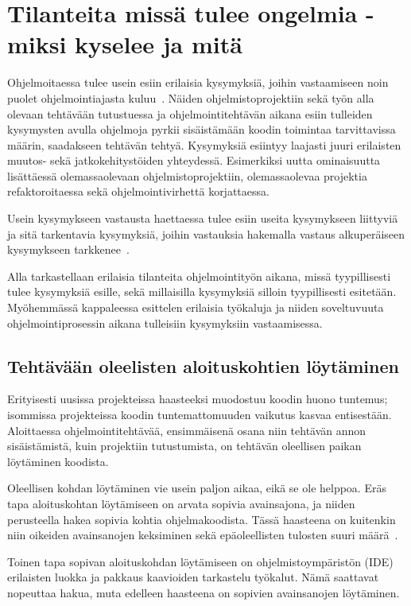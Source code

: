 \documentclass[finnish]{../tktltiki2}
\theoremstyle{definition}
\theoremstyle{remark}
\begin{document}
\section{Tilanteita missä tulee ongelmia - miksi kyselee ja mitä}
Ohjelmoitaessa tulee usein esiin erilaisia kysymyksiä, joihin vastaamiseen noin puolet ohjelmointiajasta kuluu~\cite{eliciting-design-requirements-for-maintenance-oriented-ides}. Näiden ohjelmistoprojektiin sekä työn alla olevaan tehtävään tutustuessa ja ohjelmointitehtävän aikana esiin tulleiden kysymysten avulla ohjelmoja pyrkii sisäistämään koodin toimintaa tarvittavissa määrin, saadakseen tehtävän tehtyä. Kysymyksiä esiintyy laajasti juuri erilaisten muutos- sekä jatkokehitystöiden yhteydessä. Esimerkiksi uutta ominaisuutta lisättäessä olemassaolevaan ohjelmistoprojektiin, olemassaolevaa projektia refaktoroitaessa sekä ohjelmointivirhettä korjattaessa.

Usein kysymykseen vastausta haettaessa tulee esiin useita kysymykseen liittyviä ja sitä tarkentavia kysymyksiä, joihin vastauksia hakemalla vastaus alkuperäiseen kysymykseen tarkkenee~\cite{questions-during-software-evolution-tasks}.

Alla tarkastellaan erilaisia tilanteita ohjelmointityön aikana, missä tyypillisesti tulee kysymyksiä esille, sekä millaisilla kysymyksiä silloin tyypillisesti esitetään. Myöhemmässä kappaleessa esittelen erilaisia työkaluja ja niiden soveltuvuuta ohjelmointiprosessin aikana tulleisiin kysymyksiin vastaamisessa.

\subsection{Tehtävään oleelisten aloituskohtien löytäminen}
Erityisesti uusissa projekteissa haasteeksi muodostuu koodin huono tuntemus; isommissa projekteissa koodin tuntemattomuuden vaikutus kasvaa entisestään.
Aloittaessa ohjelmointitehtävää, ensimmäisenä osana niin tehtävän annon sisäistämistä, kuin projektiin tutustumista, on tehtävän oleellisen paikan löytäminen koodista.

Oleellisen kohdan löytäminen vie usein paljon aikaa, eikä se ole helppoa. Eräs tapa aloituskohtan löytämiseen on arvata sopivia avainsajona, ja niiden perusteella hakea sopivia kohtia ohjelmakoodista. Tässä haasteena on kuitenkin niin oikeiden avainsanojen keksiminen sekä epäoleellisten tulosten suuri määrä~\cite{what-to-search-for}.

Toinen tapa sopivan aloituskohdan löytämiseen on ohjelmistoympäristön (IDE) erilaisten luokka ja pakkaus kaavioiden tarkastelu työkalut. Nämä saattavat nopeuttaa hakua, muta edelleen haasteena on sopivien avainsanojen löytäminen.
\end{document}
